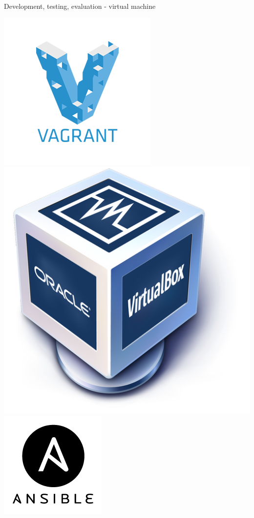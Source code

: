 \documentclass[12pt]{beamer}
\begin{document}
\begin{frame}[fragile]{Development, testing, evaluation - virtual machine}
	\begin{center}
		\includegraphics[keepaspectratio=true,height=0.4\textheight]{images/vagrant.png}
		\includegraphics[keepaspectratio=true,height=0.4\textheight]{images/virtualbox.png}
		\includegraphics[keepaspectratio=true,height=0.4\textheight]{images/ansible.png}
	\end{center}


\end{frame}
\end{document}
